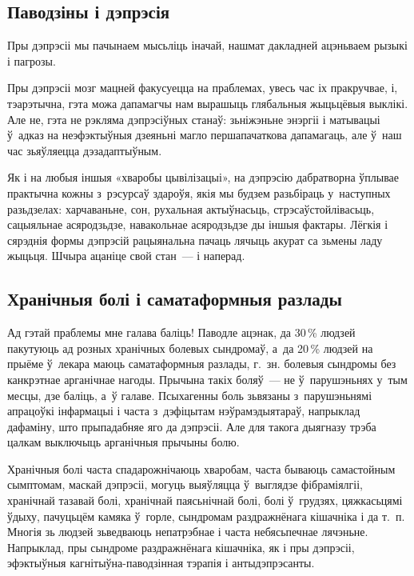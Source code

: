 \subsection*{Паводзіны і дэпрэсія}

Пры дэпрэсіі мы пачынаем мысьліць іначай, нашмат дакладней ацэньваем рызыкі і пагрозы. 


Пры дэпрэсіі мозг мацней факусуецца на праблемах, увесь час іх пракручвае, і, тэарэтычна, гэта можа дапамагчы нам вырашыць глябальныя жыцьцёвыя выклікі. Але не, гэта не рэкляма дэпрэсіўных станаў: зьніжэньне энэргіі і матывацыі ў~адказ на неэфэктыўныя дзеяньні магло першапачаткова дапамагаць, але ў~наш час зьяўляецца дэзадаптыўным.

Як і на любыя іншыя «хваробы цывілізацыі», на дэпрэсію дабратворна ўплывае практычна кожны з~рэсурсаў здароўя, якія мы будзем разьбіраць у~наступных разьдзелах: харчаваньне, сон, рухальная актыўнасьць, стрэсаўстойлівасьць, сацыяльнае асяродзьдзе, навакольнае асяродзьдзе ды іншыя фактары. Лёгкія і сярэднія формы дэпрэсій рацыянальна пачаць лячыць акурат са зьмены ладу жыцьця. Шчыра ацаніце свой стан~--- і наперад.

\subsection*{Хранічныя болі і саматаформныя разлады}

Ад гэтай праблемы мне галава баліць! Паводле ацэнак, да 30\,\% людзей пакутуюць ад розных хранічных болевых сындромаў, а~да 20\,\% людзей на прыёме ў~лекара маюць саматаформныя разлады, г.~зн. болевыя сындромы без канкрэтнае арганічнае нагоды. Прычына такіх боляў~--- не ў~парушэньнях у~тым месцы, дзе баліць, а~ў галаве. Псыхагенны боль зьвязаны з~парушэньнямі апрацоўкі інфармацыі і часта з~дэфіцытам нэўрамэдыятараў, напрыклад дафаміну, што прыпадабняе яго да дэпрэсіі. Але для такога дыягназу трэба цалкам выключыць арганічныя прычыны болю.

Хранічныя болі часта спадарожнічаюць хваробам, часта бываюць самастойным сымптомам, маскай дэпрэсіі, могуць выяўляцца ў~выглядзе фібраміялгіі, хранічнай тазавай болі, хранічнай паясьнічнай болі, болі ў~грудзях, цяжкасьцямі ўдыху, пачуцьцём камяка ў~горле, сындромам раздражнёнага кішачніка і да т.~п. Многія зь людзей зьведваюць непатрэбнае і часта небясьпечнае лячэньне. Напрыклад, пры сындроме раздражнёнага кішачніка, як і пры дэпрэсіі, эфэктыўныя кагнітыўна-паводзінная тэрапія і антыдэпрэсанты.

